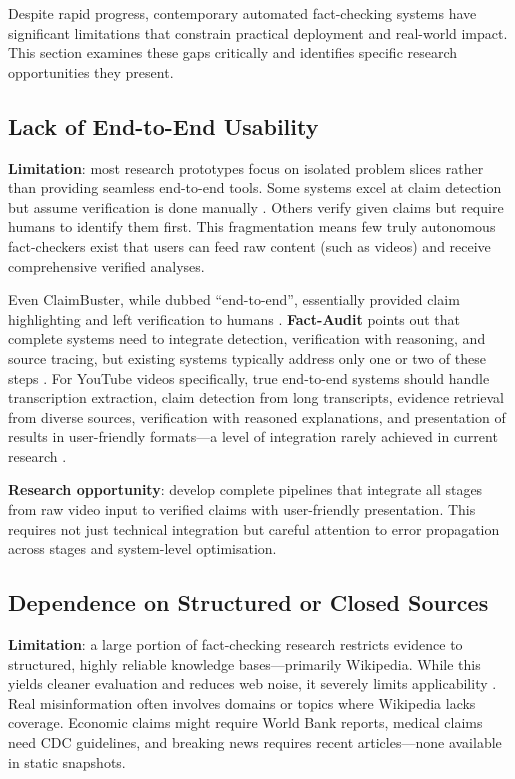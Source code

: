 \documentclass[12pt,a4paper]{article}
\begin{document}
Despite rapid progress, contemporary automated fact-checking systems have significant limitations that constrain practical deployment and real-world impact. This section examines these gaps critically and identifies specific research opportunities they present.

\subsection{Lack of End-to-End Usability}

\textbf{Limitation}: most research prototypes focus on isolated problem slices rather than providing seamless end-to-end tools. Some systems excel at claim detection but assume verification is done manually \citep{hassan2021claimbuster}. Others verify given claims but require humans to identify them first. This fragmentation means few truly autonomous fact-checkers exist that users can feed raw content (such as videos) and receive comprehensive verified analyses.

Even ClaimBuster, while dubbed ``end-to-end'', essentially provided claim highlighting and left verification to humans \citep{hassan2021claimbuster}. \textbf{Fact-Audit} points out that complete systems need to integrate detection, verification with reasoning, and source tracing, but existing systems typically address only one or two of these steps \citep{lin2025factaudit}. For YouTube videos specifically, true end-to-end systems should handle transcription extraction, claim detection from long transcripts, evidence retrieval from diverse sources, verification with reasoned explanations, and presentation of results in user-friendly formats—a level of integration rarely achieved in current research \citep{lin2025factaudit}.

\textbf{Research opportunity}: develop complete pipelines that integrate all stages from raw video input to verified claims with user-friendly presentation. This requires not just technical integration but careful attention to error propagation across stages and system-level optimisation.

\subsection{Dependence on Structured or Closed Sources}

\textbf{Limitation}: a large portion of fact-checking research restricts evidence to structured, highly reliable knowledge bases—primarily Wikipedia. While this yields cleaner evaluation and reduces web noise, it severely limits applicability \citep{aly2021feverous}. Real misinformation often involves domains or topics where Wikipedia lacks coverage. Economic claims might require World Bank reports, medical claims need CDC guidelines, and breaking news requires recent articles—none available in static snapshots.
\end{document}
